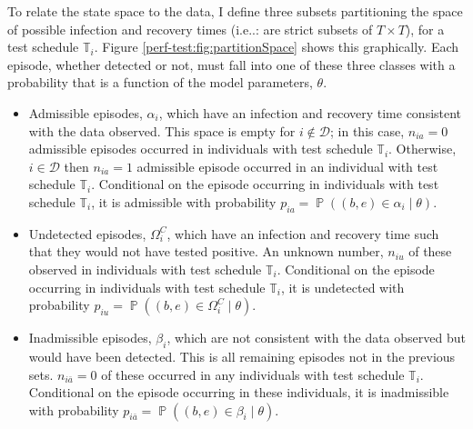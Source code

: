\documentclass[12pt, letterpaper]{article} %
\makeatletter
\DeclareRobustCommand\onedot{\futurelet\@let@token\@onedot}
\def\@onedot{\ifx\@let@token.\else.\null\fi\xspace}
\def\ie{i.e\onedot} \def\Ie{\emph{I.e}\onedot}
\DeclareMathOperator{\prob}{\mathbb{P}}
\newcommand\set{\mathcal}
\newcommand{\sched}{\mathbb{T}}
\makeatother
\begin{document}
To relate the state space to the data, I define three subsets partitioning the space of possible infection and recovery times (\ie: are strict subsets of $T \times T$), for a test schedule $\sched_i$.
Figure \ref{perf-test:fig:partitionSpace} shows this graphically.
Each episode, whether detected or not, must fall into one of these three classes with a probability that is a function of the model parameters, $\theta$.

\begin{itemize}
\item
  Admissible episodes, $\alpha_i$, which have an infection and recovery time consistent with the data observed.
  This space is empty for $i \notin \set{D}$; in this case, $n_{ia} = 0$ admissible episodes occurred in individuals with test schedule $\sched_i$.
  Otherwise, $i \in \set{D}$ then $n_{ia} =1$ admissible episode occurred in an individual with test schedule $\sched_{i}$.
  Conditional on the episode occurring in individuals with test schedule $\sched_i$, it is admissible with probability $p_{ia} = \prob((b, e) \in \alpha_i \mid \theta)$.
  \label{perf-test:def:admissible}
\item
  Undetected episodes, $\Omega_i^C$, which have an infection and recovery time such that they would not have tested positive.
  An unknown number, $n_{iu}$ of these observed in individuals with test schedule $\sched_i$.
  Conditional on the episode occurring in individuals with test schedule $\sched_i$, it is undetected with probability $p_{iu} = \prob((b, e) \in \Omega^C_i \mid \theta)$.
\item
  Inadmissible episodes, $\beta_i$, which are not consistent with the data observed but would have been
  detected.
  This is all remaining episodes not in the previous sets.
  $n_{i\bar{a}} = 0$ of these occurred in any individuals with test schedule $\sched_i$.
  Conditional on the episode occurring in these individuals, it is inadmissible with probability $p_{i\bar{a}} = \prob((b, e) \in \beta_i \mid \theta)$.
\end{itemize}

\end{document}
